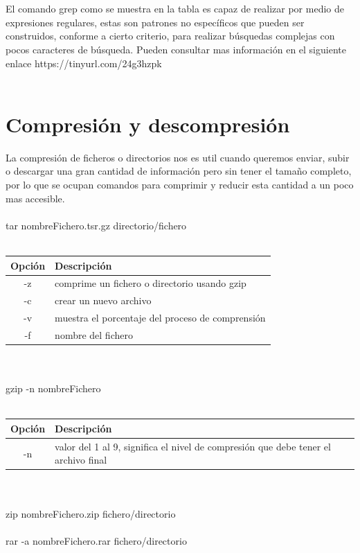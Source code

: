 \documentclass[10pt,a4paper,titlepage]{article}
\begin{document}
	\\
	\\
	El comando grep como se muestra en la tabla es capaz de realizar por medio de expresiones regulares, estas son patrones no específicos que pueden ser construidos, conforme a cierto criterio, para realizar búsquedas complejas con pocos caracteres de búsqueda. Pueden consultar mas información en el siguiente enlace https://tinyurl.com/24g3hzpk
	\\
	\\

	\section*{Compresión y descompresión}
	La compresión de ficheros o directorios nos es util cuando queremos enviar, subir o descargar una gran cantidad de información pero sin tener el tamaño completo, por lo que se ocupan comandos para comprimir y reducir esta cantidad a un poco mas accesible.
	\\
	\\
	tar nombreFichero.tsr.gz directorio/fichero
	\\
	\\
	\begin{tabular}{|c|p{8cm}|}
		\hline
		Opción & Descripción \\
		\hline
		-z & comprime un fichero o directorio usando gzip \\
		\hline
		-c & crear un nuevo archivo \\
		\hline
		-v & muestra el porcentaje del proceso de comprensión \\
		\hline
		-f & nombre del fichero \\
		\hline
	\end{tabular}
	\\
	\\
	gzip -n nombreFichero
	\\
	\\
	\begin{tabular}{|c|p{8cm}|}
		\hline
		Opción & Descripción \\
		\hline
		-n & valor del 1 al 9, significa el nivel de compresión que debe tener el archivo final \\
		\hline
	\end{tabular}
	\\
	\\
	zip nombreFichero.zip fichero/directorio
	\\
	\\
	rar -a nombreFichero.rar fichero/directorio
	\\
	\\	
	
\end{document}
